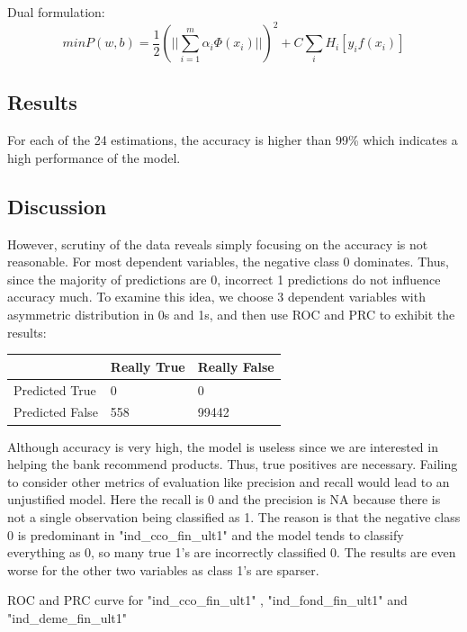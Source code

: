 \documentclass{article}
\begin{document}
\begin{spacing}{1}
\begin{large}
Dual formulation:
$$min P(w,b) = \frac{1}{2}(||\displaystyle\sum_{i=1}^{m}\alpha_i\Phi(x_i)||)^2 + C\displaystyle\sum_{i}H_{i}[y_{i}f(x_i)]$$

\subsection{Results}

For each of the 24 estimations, the accuracy is higher than 99\% which indicates a high performance of the model.

\subsection{Discussion}

However, scrutiny of the data reveals simply focusing on the accuracy is not reasonable. For most dependent variables, the negative class 0 dominates. Thus, since the majority of predictions are 0, incorrect 1 predictions do not influence accuracy much. To examine this idea, we choose 3 dependent variables with asymmetric distribution in 0s and 1s, and then use ROC and PRC to exhibit the results:

\vspace{5mm}
\begin{tabular}{| l | l | l |}
	\hline
	& Really True & Really False \\ \hline
	Predicted True & 0 & 0 \\ \hline
	Predicted False & 558 & 99442\\
	\hline
\end{tabular}
\vspace{5mm}

Although accuracy is very high, the model is useless since we are interested in helping the bank recommend products. Thus, true positives are necessary. Failing to consider other metrics of evaluation like precision and recall would lead to an unjustified model. Here the recall is 0 and the precision is NA because there is not a single observation being classified as 1. The reason is that the negative class 0 is predominant in "ind\_cco\_fin\_ult1" and the model tends to classify everything as 0, so many true 1’s are incorrectly classified 0. The results are even worse for the other two variables as class 1's are sparser.

ROC and PRC curve for "ind\_cco\_fin\_ult1" , "ind\_fond\_fin\_ult1" and "ind\_deme\_fin\_ult1"


\end{large}
\end{spacing}
\end{document}
